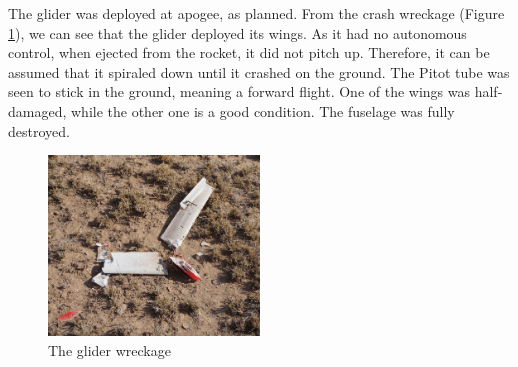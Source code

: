 The glider was deployed at apogee, as planned. From the crash wreckage (Figure \ref{f:crash}), we can see that the glider deployed its wings. As it had no autonomous control, when ejected from the rocket, it did not pitch up. Therefore, it can be assumed that it spiraled down until it crashed on the ground. The Pitot tube was seen to stick in the ground, meaning a forward flight. One of the wings was half-damaged, while the other one is a good condition. The fuselage was fully destroyed. 


\begin{figure}[h!]
    \centering
        \includegraphics[width=0.5\textwidth]{img/crash.jpg}
        \caption{The glider wreckage}
        \label{f:crash}
 \end{figure}
